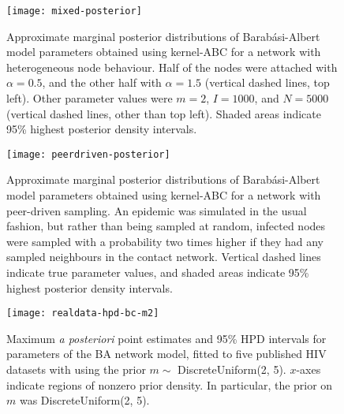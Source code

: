 \begin{figure}[ht]
    \centering
    \texttt{[image: mixed-posterior]}
    \caption[Approximate marginal posterior distributions of BA model
        parameters obtained using kernel-ABC for a network with heterogeneous
        node behaviour.]
    {
        Approximate marginal posterior distributions of Barab\'asi-Albert
        model parameters obtained using kernel-ABC for a network with
        heterogeneous node behaviour. Half of the nodes were attached with
        $\alpha = 0.5$, and the other half with $\alpha = 1.5$ (vertical
        dashed lines, top left). Other parameter values were $m = 2$, $I =
        1000$, and $N = 5000$ (vertical dashed lines, other than top left).
        Shaded areas indicate 95\% highest posterior density intervals.
    }
    \label{fig:mixed}
\end{figure}

\begin{figure}[ht]
    \centering
    \texttt{[image: peerdriven-posterior]}
    \caption[Approximate marginal posterior distributions of Barab\'asi-Albert
        model parameters obtained using kernel-ABC for a network with
        peer-driven sampling.]
    {
        Approximate marginal posterior distributions of Barab\'asi-Albert
        model parameters obtained using kernel-ABC for a network with
        peer-driven sampling. An epidemic was simulated in the usual fashion,
        but rather than being sampled at random, infected nodes were sampled
        with a probability two times higher if they had any sampled neighbours
        in the contact network. Vertical dashed lines indicate true parameter
        values, and shaded areas indicate 95\% highest posterior density
        intervals.
    }
    \label{fig:peerdriven}
\end{figure}

\begin{figure}[ht]
  \texttt{[image: realdata-hpd-bc-m2]}
  \vspace{8pt}
  \caption[
      Maximum \textit{a posteriori} point estimates and 95\% HPD intervals for
      parameters of the BA network model, fitted to five published HIV datasets
      with  using the prior $m \sim DiscreteUniform(2, 5)$.
  ]{
      Maximum \textit{a posteriori} point estimates and 95\% HPD intervals for
      parameters of the BA network model, fitted to five published HIV datasets
      with  using the prior $m \sim$ DiscreteUniform(2, 5).
      $x$-axes indicate regions of nonzero prior density. In particular, the
      prior on $m$ was DiscreteUniform(2, 5).
  }
  \label{fig:abchpdm2}
\end{figure}

